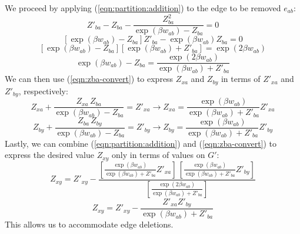We proceed by applying (\ref{eqn:partition:addition})
to the edge to be removed $e_{ab}$:
\begin{equation}
   Z'_{ba} - Z_{ba} - \frac{Z_{ba}^2}{\exp(\beta w_{ab}) - Z_{ba}} = 0
\end{equation}
\begin{equation}
   \left[\exp(\beta w_{ab}) - Z_{ba} \right] Z'_{ba} - \exp(\beta w_{ab}) Z_{ba} = 0
\end{equation}
\begin{equation}
   \left[ \exp(\beta w_{ab}) - Z_{ba} \right]
   \left[ \exp(\beta w_{ab}) + Z'_{ba} \right]
   = \exp(2 \beta w_{ab})
\end{equation}
\begin{equation}
   \exp(\beta w_{ab}) - Z_{ba}
   = \frac{\exp(2 \beta w_{ab})}{\exp(\beta w_{ab}) + Z'_{ba}}
   \label{eqn:zba-convert}
\end{equation}
We can then use (\ref{eqn:zba-convert}) to express
$Z_{xa}$ and $Z_{by}$ in terms of $Z'_{xa}$ and $Z'_{by}$,
respectively:
\begin{equation}
   Z_{xa} + \frac{Z_{xa} \, Z_{ba}}{\exp(\beta w_{ab}) - Z_{ba}} = Z'_{xa}
   \longrightarrow
   Z_{xa} = \frac{\exp(\beta w_{ab})}{\exp(\beta w_{ab}) + Z'_{ba}} Z'_{xa}
\end{equation}
\begin{equation}
   Z_{by} + \frac{Z_{ba} \, Z_{by}}{\exp(\beta w_{ab}) - Z_{ba}} = Z'_{by}
   \longrightarrow
   Z_{by} = \frac{\exp(\beta w_{ab})}{\exp(\beta w_{ab}) + Z'_{ba}} Z'_{by}
\end{equation}
Lastly, we can combine (\ref{eqn:partition:addition})
and (\ref{eqn:zba-convert}) to express the desired value $Z_{xy}$
only in terms of values on $G'$:
\begin{equation}
   Z_{xy} = Z'_{xy} -
   \frac{
   \left[ \frac{\exp(\beta w_{ab})}{\exp(\beta w_{ab}) + Z'_{ba}} Z'_{xa} \right]
   \,
   \left[ \frac{\exp(\beta w_{ab})}{\exp(\beta w_{ab}) + Z'_{ba}} Z'_{by} \right]
   }{
   \left[ \frac{\exp(2 \beta w_{ab})}{\exp(\beta w_{ab}) + Z'_{ba}} \right]
   }
\end{equation}
\begin{equation}
   Z_{xy} = Z'_{xy} -
   \frac{Z'_{xa} Z'_{by}}{\exp(\beta w_{ab}) + Z'_{ba}}
\end{equation}
This allows us to accommodate edge deletions.
